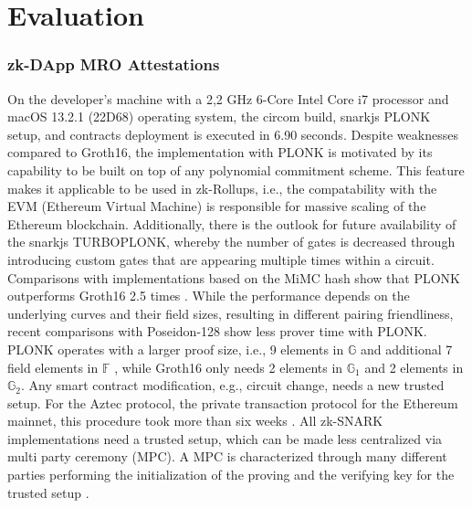\section{Evaluation}

\subsubsection{zk-DApp MRO Attestations}
On the developer's machine with a 2,2 GHz 6-Core Intel Core i7 processor and macOS 13.2.1 (22D68) operating system, the circom build, snarkjs PLONK setup, and contracts deployment is executed in 6.90 seconds. Despite weaknesses compared to Groth16, the implementation with PLONK is motivated by its capability to be built on top of any polynomial commitment scheme. This feature makes it applicable to be used in zk-Rollups, i.e., the compatability with the EVM (Ethereum Virtual Machine) is responsible for massive scaling of the Ethereum blockchain. Additionally, there is the outlook for future availability of the snarkjs TURBOPLONK, whereby the number of gates is decreased through introducing custom gates that are appearing multiple times within a circuit. Comparisons with implementations based on the MiMC hash show that PLONK outperforms Groth16 2.5 times \citep{turboplonk}. While the performance depends on the underlying curves and their field sizes, resulting in different pairing friendliness, recent comparisons with Poseidon-128 show less prover time with PLONK. PLONK operates with a larger proof size, i.e., 9 elements in \begin{math} \mathbb{G}\end{math} and additional 7 field elements in \begin{math} \mathbb{F}\end{math} \citep{PLONKcryptoeprint:2019/953}, while Groth16 only needs 2 elements in \begin{math} \mathbb{G}_1\end{math} and 2 elements in \begin{math} \mathbb{G}_2\end{math}. Any smart contract modification, e.g., circuit change, needs a new trusted setup. For the Aztec protocol, the private transaction protocol for the Ethereum mainnet, this procedure took more than six weeks \citep{turboplonk}. All zk-SNARK implementations need a trusted setup, which can be made less centralized via multi party ceremony (MPC). A MPC is characterized through many different parties performing the initialization of the proving and the verifying key for the trusted setup \citep{Thaler}. 

